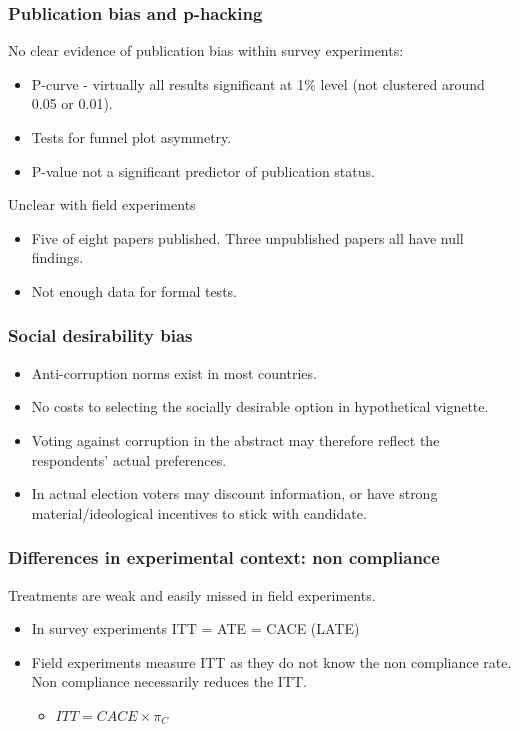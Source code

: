 \documentclass[usenames,dvipsnames]{beamer}
\begin{document}

\begin{frame}[label=pub_bias]
\frametitle{Publication bias and p-hacking}
\textcolor{Cerulean}{No clear evidence of publication bias} within survey experiments:
\pause
\begin{itemize}
\item P-curve - virtually all results significant at 1\% level (not clustered around 0.05 or 0.01).
\item Tests for funnel plot asymmetry. \hyperlink{funnel}{}
\item P-value not a significant predictor of publication status. \hyperlink{p_ols_logit}{}
\end{itemize}
\pause
Unclear with field experiments
\begin{itemize}
\item Five of eight papers published. Three unpublished papers all have null findings. \hyperlink{all_published}{}
\pause
\item Not enough data for formal tests. 
\end{itemize}

\end{frame}

\begin{frame}
\frametitle{Social desirability bias}
\begin{itemize}
\pause
\item Anti-corruption norms exist in most countries.
\pause
\item No costs to selecting the socially desirable option in hypothetical vignette. 
\pause
\item Voting against corruption in the abstract may therefore reflect the respondents’ actual preferences.
\pause
\item In actual election voters may discount information, or have strong material/ideological incentives to stick with candidate.
\end{itemize}

\end{frame}

\begin{frame}
\frametitle{Differences in experimental context: non compliance}

Treatments are weak and easily missed in field experiments. 
\begin{itemize}
\item In survey experiments ITT = ATE = CACE (LATE)
\item Field experiments measure ITT as they do not know the non compliance rate. Non compliance necessarily reduces the ITT.
\begin{itemize}
\item $ITT = CACE \times \pi_C$
\end{itemize}
\end{itemize}

\end{frame}
\end{document}
